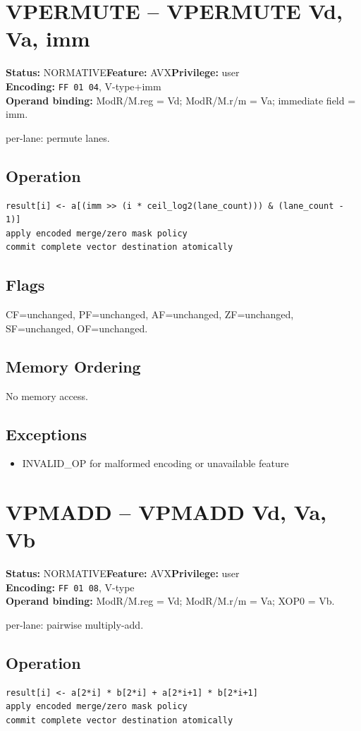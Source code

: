 \documentclass[10pt]{article}
\begin{document}
\section{VPERMUTE -- VPERMUTE Vd, Va, imm}
\textbf{Status:} NORMATIVE\quad \textbf{Feature:} AVX\quad \textbf{Privilege:} user\\
\textbf{Encoding:} \texttt{FF 01 04}, V-type+imm\\
\textbf{Operand binding:} ModR/M.reg = Vd; ModR/M.r/m = Va; immediate field = imm.

per-lane: permute lanes.

\subsection*{Operation}
\begin{lstlisting}
result[i] <- a[(imm >> (i * ceil_log2(lane_count))) & (lane_count - 1)]
apply encoded merge/zero mask policy
commit complete vector destination atomically
\end{lstlisting}
\subsection*{Flags}
CF=unchanged, PF=unchanged, AF=unchanged, ZF=unchanged, SF=unchanged, OF=unchanged.
\subsection*{Memory Ordering}
No memory access.
\subsection*{Exceptions}
\begin{itemize}
\item INVALID\_OP for malformed encoding or unavailable feature
\end{itemize}
\clearpage

\section{VPMADD -- VPMADD Vd, Va, Vb}
\textbf{Status:} NORMATIVE\quad \textbf{Feature:} AVX\quad \textbf{Privilege:} user\\
\textbf{Encoding:} \texttt{FF 01 08}, V-type\\
\textbf{Operand binding:} ModR/M.reg = Vd; ModR/M.r/m = Va; XOP0 = Vb.

per-lane: pairwise multiply-add.

\subsection*{Operation}
\begin{lstlisting}
result[i] <- a[2*i] * b[2*i] + a[2*i+1] * b[2*i+1]
apply encoded merge/zero mask policy
commit complete vector destination atomically
\end{lstlisting}
\end{document}
